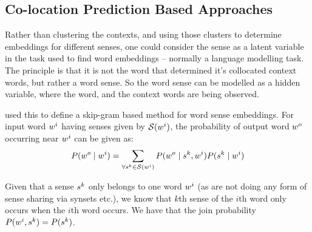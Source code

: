 \documentclass[12pt,parskip]{komatufte}
\begin{document}
\subsection{Co-location Prediction Based Approaches}
Rather than clustering the contexts, and using those clusters to determine embeddings for different senses, one could consider the sense as a latent variable in the task used to find word embeddings -- normally a language modelling task.
The principle is that it is not the word that determined it's collocated context words,
but rather a word sense.
So the word sense can be modelled as a hidden variable, where the word, and the context words are being observed.



 used this to define a  skip-gram based method for word sense embeddings.
For input word $\n w_i$ having senses given by $\seq S(\n w_i)$,
the probability of output word $\n w_o$ occurring near $\n w_i$ can be given as:
\begin{equation}
	P(\n w_o\mid \n w_i) = \sum_{\forall \n s_k \in \seq S(\n w_i)} P(\n w_o \mid \n s_k, \n w_i) P(\n s_k \mid \n w_i) \label{equ:tianmm}
\end{equation}

Given that a sense $\n s_k$ only belongs to one word $\n w_i$ (as  are not doing any form of sense sharing via synsets etc.),
we know that $k$th sense of the $i$th word only occurs when the $i$th word occurs.
We have that the join probability $P(\n w_i,\n s_k) = P(\n s_k)$.
\end{document}
